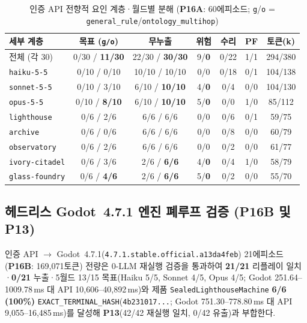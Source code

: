 \begin{table}[!tbp]
\caption{인증 API 전향적 요인 계층·월드별 분해 (\textbf{P16A}: 60에피소드; \texttt{g}/\texttt{o} = \texttt{general\_rule}/\texttt{ontology\_multihop})}
\label{tab:kbs-p16a}
\centering
\scriptsize
\setlength{\tabcolsep}{1.5pt}
\begin{tabularx}{\columnwidth}{@{}>{\raggedright\arraybackslash}X*{6}{c}@{}}
\toprule
\textbf{세부 계층} & \textbf{목표 (\texttt{g/o})} & \textbf{무누출} & \textbf{위험} & \textbf{수리} & \textbf{PF} & \textbf{토큰(k)} \\
\midrule
전체 (각 30) & 0/30 / \textbf{11/30} & 22/30 / \textbf{30/30} & 9/\textbf{0} & 0/22 & 1/1 & 294/380 \\
\texttt{haiku-5-5} & 0/10 / 0/10 & 10/10 / 10/10 & 0/0 & 0/18 & 0/1 & 104/138 \\
\texttt{sonnet-5-5} & 0/10 / 3/10 & 6/10 / \textbf{10/10} & 4/\textbf{0} & 0/4 & 0/0 & 104/130 \\
\texttt{opus-5-5} & 0/10 / \textbf{8/10} & 6/10 / \textbf{10/10} & 5/\textbf{0} & 0/0 & 1/0 & 85/112 \\
\midrule
\texttt{lighthouse} & 0/6 / 2/6 & 6/6 / 6/6 & 0/0 & 0/6 & 0/1 & 59/75 \\
\texttt{archive} & 0/6 / 0/6 & 6/6 / 6/6 & 0/0 & 0/8 & 0/0 & 60/79 \\
\texttt{observatory} & 0/6 / 2/6 & 6/6 / 6/6 & 0/0 & 0/2 & 0/0 & 61/77 \\
\texttt{ivory-citadel} & 0/6 / 3/6 & 2/6 / \textbf{6/6} & 4/\textbf{0} & 0/4 & 1/0 & 58/79 \\
\texttt{glass-foundry} & 0/6 / \textbf{4/6} & 2/6 / \textbf{6/6} & 5/\textbf{0} & 0/2 & 0/0 & 55/70 \\
\bottomrule
\end{tabularx}
\end{table}

\subsection{헤드리스 Godot~4.7.1 엔진 폐루프 검증 (\textbf{P16B} 및 \textbf{P13})}
인증 API $\rightarrow$ Godot~4.7.1(\texttt{4.7.1.\allowbreak stable.\allowbreak official.\allowbreak a13da4feb}) 21에피소드(\textbf{P16B}: 169,071토큰) 전량은 0-LLM 재실행 검증을 통과하여 \textbf{21/21} 리플레이 일치·\textbf{0/21} 누출·5월드 13/15 목표(Haiku 5/5, Sonnet 4/5, Opus 4/5; Godot 251.64--1009.78\,ms 대 API 10,606--40,892\,ms)와 제품 \texttt{Sealed\allowbreak Lighthouse\allowbreak Machine} \textbf{6/6 (100\%)} \texttt{EXACT\_\allowbreak TERMINAL\_\allowbreak HASH}(\texttt{4b231017...}; Godot 751.30--778.80\,ms 대 API 9,055--16,485\,ms)를 달성해 \textbf{P13}(42/42 재실행 일치, 0/42 유출)과 부합한다.

